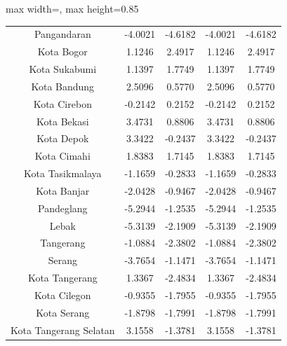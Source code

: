 \begin{table}[H]
\begin{adjustbox}{max width=\textwidth, max height=0.85\textheight}
\begin{tabular}{|c|c|c|c|c|}
Pangandaran & -4.0021 & -4.6182 & -4.0021 & -4.6182 \\
Kota Bogor & 1.1246 & 2.4917 & 1.1246 & 2.4917 \\
Kota Sukabumi & 1.1397 & 1.7749 & 1.1397 & 1.7749 \\
Kota Bandung & 2.5096 & 0.5770 & 2.5096 & 0.5770 \\
Kota Cirebon & -0.2142 & 0.2152 & -0.2142 & 0.2152 \\
Kota Bekasi & 3.4731 & 0.8806 & 3.4731 & 0.8806 \\
Kota Depok & 3.3422 & -0.2437 & 3.3422 & -0.2437 \\
Kota Cimahi & 1.8383 & 1.7145 & 1.8383 & 1.7145 \\
Kota Tasikmalaya & -1.1659 & -0.2833 & -1.1659 & -0.2833 \\
Kota Banjar & -2.0428 & -0.9467 & -2.0428 & -0.9467 \\
Pandeglang & -5.2944 & -1.2535 & -5.2944 & -1.2535 \\
Lebak & -5.3139 & -2.1909 & -5.3139 & -2.1909 \\
Tangerang & -1.0884 & -2.3802 & -1.0884 & -2.3802 \\
Serang & -3.7654 & -1.1471 & -3.7654 & -1.1471 \\
Kota Tangerang & 1.3367 & -2.4834 & 1.3367 & -2.4834 \\
Kota Cilegon & -0.9355 & -1.7955 & -0.9355 & -1.7955 \\
Kota Serang & -1.8798 & -1.7991 & -1.8798 & -1.7991 \\
Kota Tangerang Selatan & 3.1558 & -1.3781 & 3.1558 & -1.3781 \\
\hline
\end{tabular}
\end{adjustbox}
\end{table}